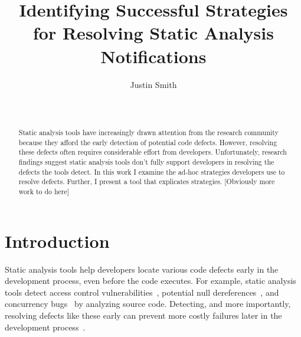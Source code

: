 \documentclass{sig-alternate}
\begin{document}
\toappear{}
\title{Identifying Successful Strategies for Resolving Static Analysis Notifications}

\author{
\alignauthor Justin Smith\\
\\
 \\
}

\maketitle


\begin{abstract}
Static analysis tools have increasingly drawn attention from the research community because they afford the early detection of potential code defects.
However, resolving these defects often requires considerable effort from developers.
Unfortunately, research findings suggest static analysis tools don't fully support developers in resolving the defects the tools detect.
In this work I examine the ad-hoc strategies developers use to resolve defects. 
Further, I present a tool that explicates strategies.
[Obviously more work to do here]

\end{abstract}


\section{Introduction}
\label{sec:intro}
Static analysis tools help developers locate various code defects early in the development process, even before the code executes. 
For example, static analysis tools detect access control vulnerabilities~\cite{Aside}, potential null dereferences~\cite{FindBugs}, and concurrency bugs~\cite{ThreadSafe} by analyzing source code.
Detecting, and more importantly, resolving defects like these early can prevent more costly failures later in the development process~\cite{ayewah2008using}.
\end{document}
